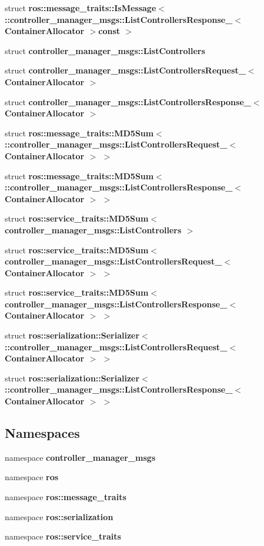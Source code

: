 \begin{DoxyCompactItemize}
struct {\bf ros\-::message\-\_\-traits\-::\-Is\-Message$<$ \-::controller\-\_\-manager\-\_\-msgs\-::\-List\-Controllers\-Response\-\_\-$<$ Container\-Allocator $>$const  $>$}
\item 
struct {\bf controller\-\_\-manager\-\_\-msgs\-::\-List\-Controllers}
\item 
struct {\bf controller\-\_\-manager\-\_\-msgs\-::\-List\-Controllers\-Request\-\_\-$<$ Container\-Allocator $>$}
\item 
struct {\bf controller\-\_\-manager\-\_\-msgs\-::\-List\-Controllers\-Response\-\_\-$<$ Container\-Allocator $>$}
\item 
struct {\bf ros\-::message\-\_\-traits\-::\-M\-D5\-Sum$<$ \-::controller\-\_\-manager\-\_\-msgs\-::\-List\-Controllers\-Request\-\_\-$<$ Container\-Allocator $>$ $>$}
\item 
struct {\bf ros\-::message\-\_\-traits\-::\-M\-D5\-Sum$<$ \-::controller\-\_\-manager\-\_\-msgs\-::\-List\-Controllers\-Response\-\_\-$<$ Container\-Allocator $>$ $>$}
\item 
struct {\bf ros\-::service\-\_\-traits\-::\-M\-D5\-Sum$<$ controller\-\_\-manager\-\_\-msgs\-::\-List\-Controllers $>$}
\item 
struct {\bf ros\-::service\-\_\-traits\-::\-M\-D5\-Sum$<$ controller\-\_\-manager\-\_\-msgs\-::\-List\-Controllers\-Request\-\_\-$<$ Container\-Allocator $>$ $>$}
\item 
struct {\bf ros\-::service\-\_\-traits\-::\-M\-D5\-Sum$<$ controller\-\_\-manager\-\_\-msgs\-::\-List\-Controllers\-Response\-\_\-$<$ Container\-Allocator $>$ $>$}
\item 
struct {\bf ros\-::serialization\-::\-Serializer$<$ \-::controller\-\_\-manager\-\_\-msgs\-::\-List\-Controllers\-Request\-\_\-$<$ Container\-Allocator $>$ $>$}
\item 
struct {\bf ros\-::serialization\-::\-Serializer$<$ \-::controller\-\_\-manager\-\_\-msgs\-::\-List\-Controllers\-Response\-\_\-$<$ Container\-Allocator $>$ $>$}
\end{DoxyCompactItemize}
\subsection*{\-Namespaces}
\begin{DoxyCompactItemize}
\item 
namespace {\bf controller\-\_\-manager\-\_\-msgs}
\item 
namespace {\bf ros}
\item 
namespace {\bf ros\-::message\-\_\-traits}
\item 
namespace {\bf ros\-::serialization}
\item 
namespace {\bf ros\-::service\-\_\-traits}
\end{DoxyCompactItemize}
